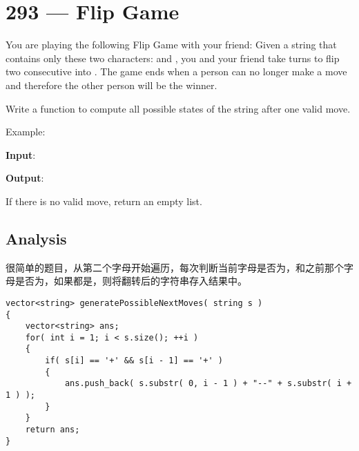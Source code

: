 \section{293 --- Flip Game }
You are playing the following Flip Game with your friend: Given a string that contains only these two characters:  and , you and your friend take turns to flip two consecutive  into . The game ends when a person can no longer make a move and therefore the other person will be the winner.

Write a function to compute all possible states of the string after one valid move.

\begin{flushleft}
Example:

\textbf{Input}: 

\textbf{Output}: 

  
  
\end{flushleft}

If there is no valid move, return an empty list.
\subsection{Analysis}
很简单的题目，从第二个字母开始遍历，每次判断当前字母是否为，和之前那个字母是否为，如果都是，则将翻转后的字符串存入结果中。
\setcounter{lstlisting}{0}
\begin{lstlisting}[style=customc, caption={Loop}]
vector<string> generatePossibleNextMoves( string s )
{
    vector<string> ans;
    for( int i = 1; i < s.size(); ++i )
    {
        if( s[i] == '+' && s[i - 1] == '+' )
        {
            ans.push_back( s.substr( 0, i - 1 ) + "--" + s.substr( i + 1 ) );
        }
    }
    return ans;
}
\end{lstlisting}